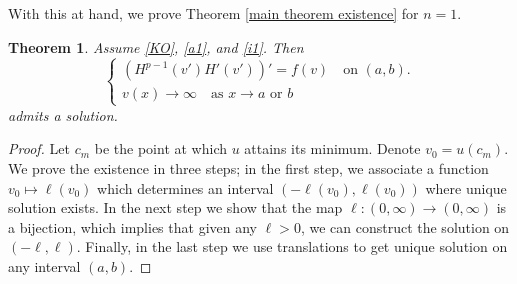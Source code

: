 \documentclass[11pt]{amsart}
\newtheorem{theorem}{Theorem}[section]
\numberwithin{equation}{section}
\begin{document}
    With this at hand, we prove Theorem \ref{main theorem existence} for $n=1$.
    \begin{theorem}\label{thrm existence in one dim with osgood}
        Assume \ref{KO}, \ref{a1}, and \ref{i1}. Then  
        \begin{equation}\label{eqn in one dim}
        \begin{cases}
      \left(H^{p-1}(v')H'(v')\right)'=f(v)\quad \text{on } (a,b). \\
      v(x)\to \infty \quad \text{as } x\to a \text{ or }b
        \end{cases}
        \end{equation}
        admits a solution.
    \end{theorem}
    \begin{proof}Let $c_{m}$ be the point at which $u$ attains its minimum. Denote $v_{0}=u(c_{m})$. We prove the existence in three steps; in the first step, we associate a function $v_{0} \mapsto \ell(v_{0})$ which determines an interval $\left(-\ell(v_{0}),\ell(v_{0})\right)$ where unique solution exists. In the next step we show that the map $\ell:(0,\infty)\to (0,\infty)$ is a bijection, which implies that given any $\ell>0$, we can construct the solution on $(-\ell,\ell)$. Finally, in the last step we use translations to get unique solution on any interval $(a,b)$.


\end{proof}
\end{document}
